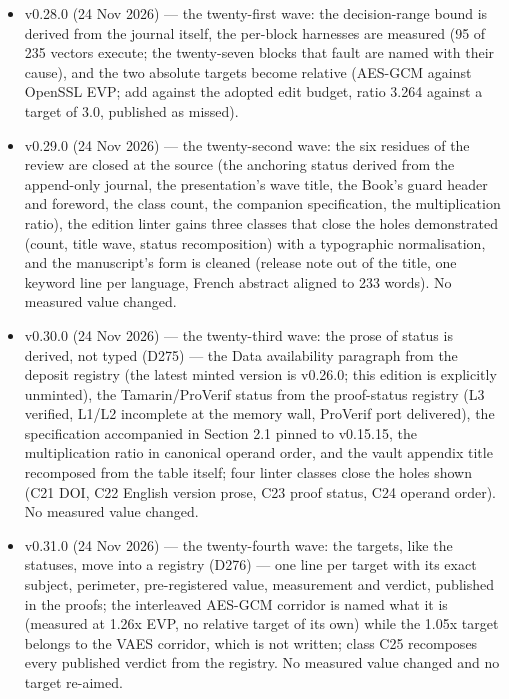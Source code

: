 \documentclass[10pt,a4paper]{article}
\begin{document}
\begin{itemize}
\item v0.28.0 (24 Nov 2026) --- the twenty-first wave: the decision-range bound is derived from the journal itself, the per-block harnesses are measured (95 of 235 vectors execute; the twenty-seven blocks that fault are named with their cause), and the two absolute targets become relative (AES-GCM against OpenSSL EVP; add against the adopted edit budget, ratio 3.264 against a target of 3.0, published as missed).\item v0.29.0 (24 Nov 2026) --- the twenty-second wave: the six residues of the review are closed at the source (the anchoring status derived from the append-only journal, the presentation's wave title, the Book's guard header and foreword, the class count, the companion specification, the multiplication ratio), the edition linter gains three classes that close the holes demonstrated (count, title wave, status recomposition) with a typographic normalisation, and the manuscript's form is cleaned (release note out of the title, one keyword line per language, French abstract aligned to 233 words). No measured value changed.\item v0.30.0 (24 Nov 2026) --- the twenty-third wave: the prose of status is derived, not typed (D275) --- the Data availability paragraph from the deposit registry (the latest minted version is v0.26.0; this edition is explicitly unminted), the Tamarin/ProVerif status from the proof-status registry (L3 verified, L1/L2 incomplete at the memory wall, ProVerif port delivered), the specification accompanied in Section 2.1 pinned to v0.15.15, the multiplication ratio in canonical operand order, and the vault appendix title recomposed from the table itself; four linter classes close the holes shown (C21 DOI, C22 English version prose, C23 proof status, C24 operand order). No measured value changed.\item v0.31.0 (24 Nov 2026) --- the twenty-fourth wave: the targets, like the statuses, move into a registry (D276) --- one line per target with its exact subject, perimeter, pre-registered value, measurement and verdict, published in the proofs; the interleaved AES-GCM corridor is named what it is (measured at 1.26x EVP, no relative target of its own) while the 1.05x target belongs to the VAES corridor, which is not written; class C25 recomposes every published verdict from the registry. No measured value changed and no target re-aimed.

\end{itemize}
\end{document}

